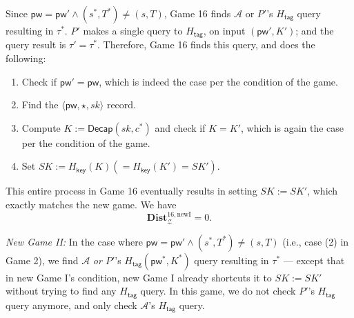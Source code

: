 \documentclass{article}
\theoremstyle{plain}
\theoremstyle{definition}
\theoremstyle{remark}
\newcommand{\adv}{\mathcal{A}}
\newcommand{\env}{\mathcal{Z}}
\newcommand{\Dist}{\mathbf{Dist}}
\newcommand{\Decap}{\mathsf{Decap}}
\newcommand{\Hkey}{H_\mathsf{key}}
\newcommand{\Htag}{H_\mathsf{tag}}
\newcommand{\pw}{\mathsf{pw}}
\begin{document}
Since $\pw = \pw' \land (s^*,T^*) \neq (s,T)$, Game 16 finds $\adv$ or $P'$'s $\Htag$ query resulting in $\tau^*$. $P'$ makes a single query to $\Htag$, on input $(\pw',K')$; and the query result is $\tau' = \tau^*$. Therefore, Game 16 finds this query, and does the following:
\begin{enumerate}
  \item Check if $\pw' = \pw$, which is indeed the case per the condition of the game.
  \item Find the $\langle\pw,\star,sk\rangle$ record.
  \item Compute $K := \Decap(sk,c^*)$ and check if $K = K'$, which is again the case per the condition of the game.
  \item Set $SK := \Hkey(K) (= \Hkey(K') = SK')$.
\end{enumerate}
This entire process in Game 16 eventually results in setting $SK := SK'$, which exactly matches the new game. We have
\[
\Dist_\env^{16,\text{newI}} = 0.
\]

\noindent\emph{New Game II:} In the case where $\pw = \pw' \land (s^*,T^*) \neq (s,T)$ (i.e., case (2) in Game 2), we find $\adv$ \emph{or $P'$}'s $\Htag(\pw^*,K^*)$ query resulting in $\tau^*$ --- except that in new Game I's condition, new Game I already shortcuts it to $SK := SK'$ without trying to find any $\Htag$ query. In this game, we do not check $P'$'s $\Htag$ query anymore, and only check $\adv$'s $\Htag$ query.
\end{document}
